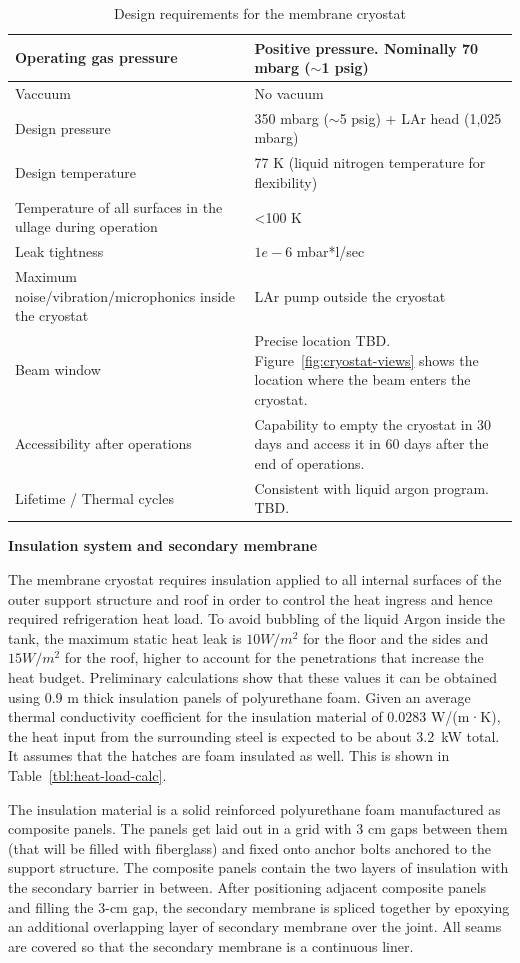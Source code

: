 \begin{table}[htpb]
\begin{tabular}{|p{}|p{}|}
Operating gas pressure   &  Positive pressure. Nominally 70 mbarg ($\sim$1 psig) \\ \hline
 Vaccuum  &  No vacuum \\ \hline
 Design pressure  &  350 mbarg ($\sim$5 psig) + LAr head (1,025 mbarg) \\ \hline
Design temperature   &  77 K (liquid nitrogen temperature for flexibility) \\ \hline
Temperature of all surfaces in the ullage during operation   & \textless 100 K  \\ \hline
Leak tightness   & $1e-6$ mbar*l/sec   \\ \hline
Maximum noise/vibration/microphonics inside the cryostat   & LAr pump outside the cryostat  \\ \hline
Beam window   & Precise location TBD. Figure~\ref{fig:cryostat-views} shows the location where the beam enters the cryostat.  \\ \hline
 Accessibility after operations  & Capability to empty the cryostat in 30 days and access it in 60 days after the end of operations. \\ \hline
  Lifetime / Thermal cycles &  Consistent with liquid argon program. TBD. \\ \hline
 \end{tabular}
\caption{Design requirements for the membrane cryostat}
\end{table}

\textbf{Insulation system and secondary membrane}

The membrane cryostat requires insulation applied to all internal surfaces of the outer support structure 
and roof in order to control the heat ingress and hence required refrigeration heat load. 
To avoid bubbling of the liquid Argon inside the tank, the maximum static heat leak is $10 W/m^2$ for the floor and the sides and $15 W/m^2$ for the roof, higher to account for the penetrations that increase the heat budget. Preliminary calculations show that these values it can be obtained using 0.9 m thick insulation panels of polyurethane foam.
Given an 
average thermal conductivity coefficient for the insulation material of 0.0283 W/(m·K), the heat input 
from the surrounding steel is expected to be about 3.2~kW total. It assumes that the hatches are foam 
insulated as well. This is shown in Table~\ref{tbl:heat-load-calc}.

The insulation material is a solid reinforced polyurethane foam manufactured as composite panels. The 
panels get laid out in a grid with 3 cm gaps between them (that will be filled with fiberglass) and fixed 
onto anchor bolts anchored to the support structure. The composite panels contain the two layers of 
insulation with the secondary barrier in between. After positioning adjacent composite panels and filling 
the 3-cm gap, the secondary membrane is spliced together by epoxying an additional overlapping layer 
of secondary membrane over the joint. All seams are covered so that the secondary membrane is a 
continuous liner.

